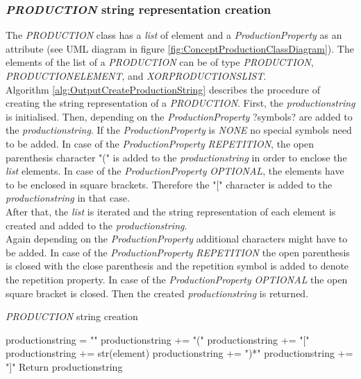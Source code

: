\subsubsection{\textit{PRODUCTION} string representation creation}

The \textit{PRODUCTION} class has a \textit{list} of element and a \textit{ProductionProperty} as an attribute (see UML diagram in figure \ref{fig:ConceptProductionClassDiagram}).
The elements of the list of a \textit{PRODUCTION} can be of type \textit{PRODUCTION}, \textit{PRODUCTION\textunderscore ELEMENT}, and \textit{XOR\textunderscore PRODUCTIONS\textunderscore LIST}.\\
Algorithm \ref{alg:OutputCreateProductionString} describes the procedure of creating the string representation of a \textit{PRODUCTION}.
First, the \textit{production\textunderscore string} is initialised.
Then, depending on the \textit{ProductionProperty} ?symbols? are added to the \textit{production\textunderscore string}.
If the \textit{ProductionProperty} is \textit{NONE} no special symbols need to be added.
In case of the \textit{ProductionProperty} \textit{REPETITION}, the open parenthesis character "(" is added to the \textit{production\textunderscore string} in order to enclose the \textit{list} elements.
In case of the \textit{ProductionProperty} \textit{OPTIONAL}, the elements have to be enclosed in square brackets. Therefore the "[" character is added to the \textit{production\textunderscore string} in that case.\\
After that, the \textit{list} is iterated and the string representation of each element is created and added to the \textit{production\textunderscore string}.\\
Again depending on the \textit{ProductionProperty} additional characters might have to be added.
In case of the \textit{ProductionProperty} \textit{REPETITION} the open parenthesis is closed with the close parenthesis and the repetition symbol is added to denote the repetition property.
In case of the \textit{ProductionProperty} \textit{OPTIONAL} the open square bracket is closed.
Then the created \textit{production\textunderscore string} is returned.

\begin{algorithm}[H]
\caption{\textit{PRODUCTION} string creation}
\label{alg:OutputCreateProductionString}
\begin{algorithmic}[1]
\State production\textunderscore string = ""
	\State production\textunderscore string += "("
	\State production\textunderscore string += "["
\EndIf
{}
		\State production\textunderscore string += str(element)
\EndFor
{}
	\State production\textunderscore string += ")*"
	\State production\textunderscore string += "]"
\EndIf
\State Return production\textunderscore string
\end{algorithmic}
\end{algorithm}

